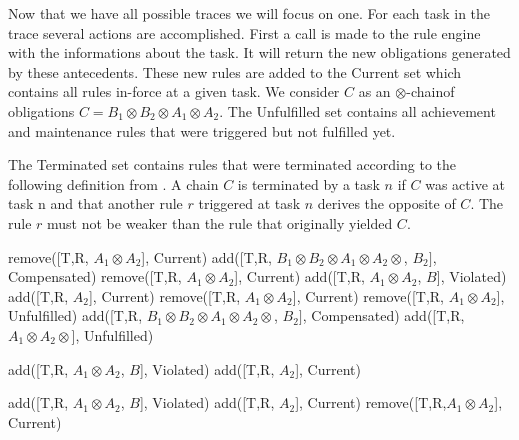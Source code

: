 \documentclass[10pt]{report}
\newcommand{\ochain}{$\otimes$-chain}
\begin{document}
Now that we have all possible traces we will focus on one. For each task in the trace several actions are accomplished. First a call is made to the rule engine with the informations about the task. It will return the new obligations generated by these antecedents. These new rules are added to the Current set which contains all rules in-force at a given task. We consider $C$ as an \ochain of obligations $C= B_{1} \otimes B_{2} \otimes A_{1} \otimes A_{2}$. The Unfulfilled set contains all achievement and maintenance rules that were triggered but not fulfilled yet.

The Terminated set contains rules that were terminated according to the following definition from \autocite{ConceptuallyRichModelofBPC}. A chain $C$ is terminated by a task $n$ if $C$ was active at task n and that another rule $r$ triggered at task $n$ derives the opposite of $C$. The rule $r$ must not be weaker than the rule that originally yielded $C$.

\begin{algorithmic}
			\State remove([T,R, $A_{1} \otimes A_{2}$], Current)
				\State add([T,R, $B_{1} \otimes B_{2} \otimes A_{1} \otimes A_{2} \otimes$, $B_{2}]$, Compensated)
			\EndIf
		\Else 
			\State remove([T,R, $A_{1} \otimes A_{2} $], Current)
			\State add([T,R, $A_{1} \otimes A_{2}$, $B$], Violated)
			\State add([T,R, $A_{2}$], Current)
		\EndIf
	\EndIf
			\State remove([T,R, $A_{1} \otimes A_{2}$], Current)
			\State remove([T,R, $A_{1} \otimes A_{2}$], Unfulfilled)
				\State add([T,R, $B_{1} \otimes B_{2} \otimes A_{1} \otimes A_{2} \otimes$, $B_{2}]$, Compensated)
			\EndIf
		\Else
			\State add([T,R, $A_{1} \otimes A_{2} \otimes$], Unfulfilled)
		\EndIf
	\EndIf
	
			\State add([T,R, $A_{1} \otimes A_{2}$, $B$], Violated)
			\State add([T,R, $A_{2}$], Current)
		\EndIf
	\EndIf
\EndFor

\State

		\State add([T,R, $A_{1} \otimes A_{2}$, $B$], Violated)
		\State add([T,R, $A_{2}$], Current)
	\EndIf
		\State remove([T,R,$A_{1} \otimes A_{2}$], Current)
	\EndIf
\EndFor
\end{algorithmic}
\end{document}
